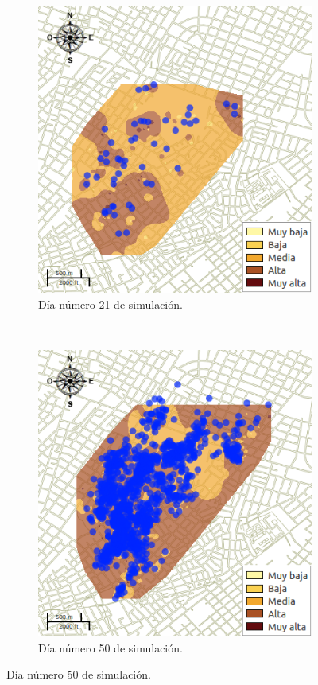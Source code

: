\begin{figure}[!htbp]
    \begin{subfigure}[b]{0.45\textwidth}
            \includegraphics[width=\textwidth]{capitulo-6/graphics/raster/temp-30-20.png}
            \caption{\label{fig:niveles-infestacion-30-c}Día número 21 de simulación.}
    \end{subfigure}
    ~~
    \begin{subfigure}[b]{0.45\textwidth}
            \includegraphics[width=\textwidth]{capitulo-6/graphics/raster/temp-30-35.png}
            \caption{\label{fig:niveles-infestacion-30-d}Día número 50 de simulación.}
    \end{subfigure}


\end{figure}
